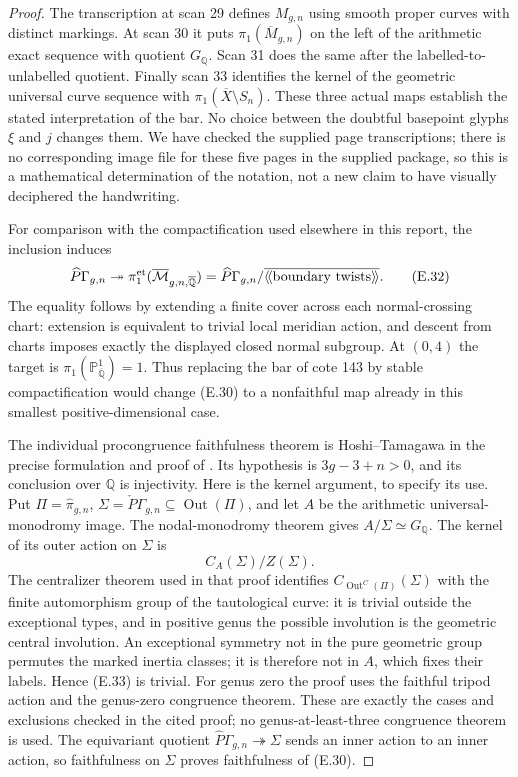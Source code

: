 \begin{proof}
The transcription at scan 29 defines $M_{g,n}$ using smooth
proper curves with distinct markings.  At scan 30 it puts
$\pi_1(\overline M_{g,n})$ on the left of the arithmetic
exact sequence with quotient $G_{\mathbb Q}$.  Scan 31 does
the same after the labelled-to-unlabelled quotient.  Finally
scan 33 identifies the kernel of the geometric universal
curve sequence with $\pi_1(\overline X\setminus S_n)$.
These three actual maps establish the stated interpretation
of the bar.  No choice between the doubtful basepoint glyphs
$\xi$ and $j$ changes them.  We have checked the supplied
page transcriptions; there is no corresponding image file
for these five pages in the supplied package, so this is
a mathematical determination of the notation, not a new
claim to have visually deciphered the handwriting.

For comparison with the compactification used elsewhere in
this report, the inclusion induces
\[
 \widehat P\Gamma_{g,n}\twoheadrightarrow
 \pi_1^{\rm et}(\overline{\mathcal M}_{g,n,\overline{\mathbb Q}})
 =\widehat P\Gamma_{g,n}/
       \overline{\langle\!\langle\text{boundary twists}
                                  \rangle\!\rangle}.           \tag{E.32}
\]
The equality follows by extending a finite cover across each
normal-crossing chart: extension is equivalent to trivial
local meridian action, and descent from charts imposes
exactly the displayed closed normal subgroup.  At $(0,4)$
the target is $\pi_1(\mathbb P^1_{\overline{\mathbb Q}})=1$.
Thus replacing the bar of cote 143 by stable compactification
would change (E.30) to a nonfaithful map already in this
smallest positive-dimensional case.

The individual procongruence faithfulness theorem is
Hoshi--Tamagawa in the precise formulation and proof of
\cite[Theorem 2.5, pp.~8--9]{ET_Iijima2012}.  Its hypothesis
is $3g-3+n>0$, and its conclusion over $\mathbb Q$ is
injectivity.  Here is the kernel argument, to specify its
use.  Put $\Pi=\widehat\pi_{g,n}$,
$\Sigma=\check P\Gamma_{g,n}\subseteq\operatorname{Out}(\Pi)$,
and let $A$ be the arithmetic universal-monodromy image.
The nodal-monodromy theorem gives
$A/\Sigma\simeq G_{\mathbb Q}$.  The kernel of its outer
action on $\Sigma$ is
\[
 C_A(\Sigma)/Z(\Sigma).                                       \tag{E.33}
\]
The centralizer theorem used in that proof identifies
$C_{\operatorname{Out}^C(\Pi)}(\Sigma)$ with the finite
automorphism group of the tautological curve: it is trivial
outside the exceptional types, and in positive genus the
possible involution is the geometric central involution.
An exceptional symmetry not in the pure geometric group
permutes the marked inertia classes; it is therefore not
in $A$, which fixes their labels.  Hence (E.33) is trivial.
For genus zero the proof uses the faithful tripod action
and the genus-zero congruence theorem.  These are exactly
the cases and exclusions checked in the cited proof; no
genus-at-least-three congruence theorem is used.  The
equivariant quotient
$\widehat P\Gamma_{g,n}\twoheadrightarrow\Sigma$ sends an
inner action to an inner action, so faithfulness on
$\Sigma$ proves faithfulness of (E.30).


\end{proof}
